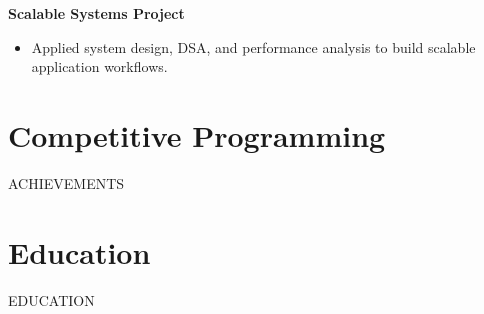 \documentclass[10pt]{article}
\begin{document}
\textbf{Scalable Systems Project}\\
\begin{itemize}
\item Applied system design, DSA, and performance analysis to build scalable application workflows.
\end{itemize}

\section*{Competitive Programming}
{{ACHIEVEMENTS}}

\section*{Education}
{{EDUCATION}}
\end{document}
